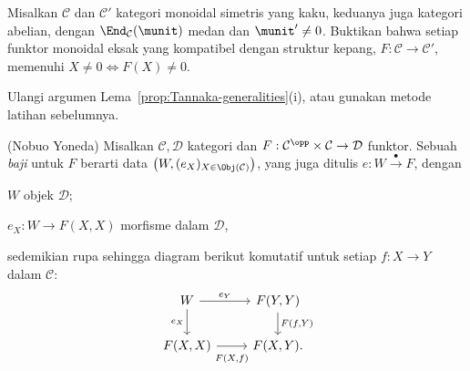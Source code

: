 \begin{Exercises}
	\item Misalkan $\mathcal{C}$ dan $\mathcal{C}'$ kategori monoidal
	simetris yang kaku, keduanya juga kategori abelian, dengan
	$\End_{\mathcal{C}}(\munit)$ medan dan $\munit'\neq0$. Buktikan bahwa
	setiap funktor monoidal eksak yang kompatibel dengan struktur kepang,
	$F:\mathcal{C}\to\mathcal{C}'$, memenuhi
	$X\neq0\iff F(X)\neq0$.
	\begin{hint}
		Ulangi argumen Lema~\ref{prop:Tannaka-generalities}(i), atau gunakan
		metode latihan sebelumnya.
	\end{hint}

	\item (Nobuo Yoneda) Misalkan $\mathcal{C},\mathcal{D}$ kategori dan
	$F:\mathcal{C}^{\opp}\times\mathcal{C}\to\mathcal{D}$ funktor. Sebuah
	\emph{baji} untuk $F$ berarti data
	$\left(W,(e_X)_{X\in\Obj(\mathcal{C})}\right)$, yang juga ditulis
	$e:W\xrightarrow{\bullet}F$, dengan
	\begin{compactitem}
		\item $W$ objek $\mathcal{D}$;
		\item $e_X:W\to F(X,X)$ morfisme dalam $\mathcal{D}$,
	\end{compactitem}
	sedemikian rupa sehingga diagram berikut komutatif untuk setiap
	$f:X\to Y$ dalam $\mathcal{C}$:
	\[\begin{tikzcd}
		W \arrow[r, "e_Y"] \arrow[d, "e_X"'] & F(Y, Y) \arrow[d, "{F(f, Y)}"] \\
		F(X, X) \arrow[r, "{F(X, f)}"' inner sep=0.6em] & F(X, Y).
	\end{tikzcd}\]


\end{Exercises}
